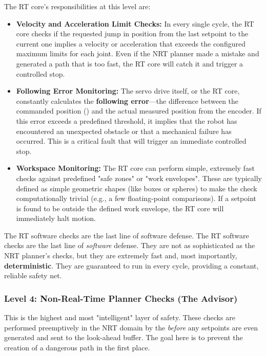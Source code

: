 The RT core's responsibilities at this level are:
\begin{itemize}
    \item \textbf{Velocity and Acceleration Limit Checks:} In every single cycle, the RT core checks if the requested jump in position from the last setpoint to the current one implies a velocity or acceleration that exceeds the configured maximum limits for each joint. Even if the NRT planner made a mistake and generated a path that is too fast, the RT core will catch it and trigger a controlled stop.
    
    \item \textbf{Following Error Monitoring:} The servo drive itself, or the RT core, constantly calculates the \textbf{following error}—the difference between the commanded position () and the actual measured position from the encoder. If this error exceeds a predefined threshold, it implies that the robot has encountered an unexpected obstacle or that a mechanical failure has occurred. This is a critical fault that will trigger an immediate controlled stop.
    
    \item \textbf{Workspace Monitoring:} The RT core can perform simple, extremely fast checks against predefined "safe zones" or "work envelopes". These are typically defined as simple geometric shapes (like boxes or spheres) to make the check computationally trivial (e.g., a few floating-point comparisons). If a setpoint is found to be outside the defined work envelope, the RT core will immediately halt motion.
\end{itemize}

\begin{principlebox}{The RT software checks are the last line of software defense.}
    The RT software checks are the last line of \textit{software} defense. They are not as sophisticated as the NRT planner's checks, but they are extremely fast and, most importantly, \textbf{deterministic}. They are guaranteed to run in every cycle, providing a constant, reliable safety net.
\end{principlebox}

\subsubsection{Level 4: Non-Real-Time Planner Checks (The Advisor)}
\label{subsubsec:level4_nrt_checks}

This is the highest and most "intelligent" layer of safety. These checks are performed preemptively in the NRT domain by the  \textit{before} any setpoints are even generated and sent to the look-ahead buffer. The goal here is to prevent the creation of a dangerous path in the first place.


